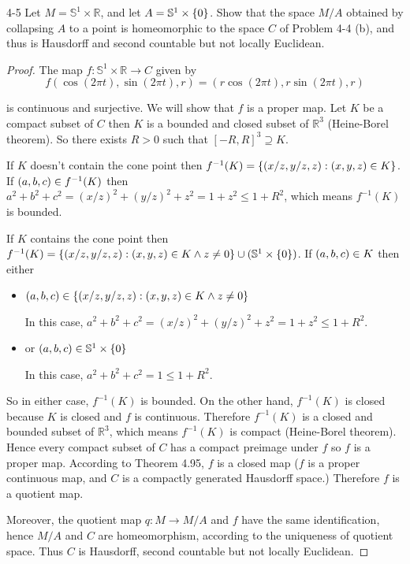 \begin{problem}{4-5}
Let $M = \mathbb{S}^{1}\times\mathbb{R}$, and let $A = \mathbb{S}^{1} \times \left\{{0}\right\}$. Show that the space $M/A$ obtained by collapsing $A$ to a point is homeomorphic to the space $C$ of Problem 4-4 (b), and thus is Hausdorff and second countable but not locally Euclidean.
\end{problem}

\begin{proof}
	The map $f: \mathbb{S}^{1}\times\mathbb{R} \to C$ given by
	\begin{equation*}
		f(\cos(2\pi t), \sin(2\pi t), r) = (r\cos(2\pi t), r\sin(2\pi t), r)
	\end{equation*}

	is continuous and surjective. We will show that $f$ is a proper map. Let $K$ be a compact subset of $C$ then $K$ is a bounded and closed subset of $\mathbb{R}^{3}$ (Heine-Borel theorem). So there exists $R > 0$ such that ${[-R, R]}^{3} \supseteq K$.

	If $K$ doesn't contain the cone point then $f^{-1}(K) = \left\{{\left({x/z, y/z, z}\right) : \left({x, y, z}\right) \in K}\right\}$. If $\left({a,b,c}\right) \in f^{-1}(K)$ then $a^{2} + b^{2} + c^{2} = {(x/z)}^{2} + {(y/z)}^{2} + z^{2} = 1 + z^{2} \leq 1 + R^{2}$, which means $f^{-1}(K)$ is bounded.

	If $K$ contains the cone point then $f^{-1}(K) = \left\{{\left({x/z, y/z,z}\right) : \left({x, y, z}\right)\in K \land z\ne 0}\right\} \cup (\mathbb{S}^{1} \times \left\{{0}\right\})$. If $\left({a, b, c}\right) \in K$ then either
	\begin{itemize}
		\item $\left({a, b, c}\right)\in \left\{{\left({x/z, y/z, z}\right) : \left({x,y,z}\right)\in K \land z\ne 0}\right\}$

		      In this case, $a^{2} + b^{2} + c^{2} = {(x/z)}^{2} + {(y/z)}^{2} + z^{2} = 1 + z^{2} \leq 1 + R^{2}$.
		\item or $\left({a, b, c}\right)\in \mathbb{S}^{1}\times\left\{{0}\right\}$

		      In this case, $a^{2} + b^{2} + c^{2} = 1 \leq 1 + R^{2}$.
	\end{itemize}

	So in either case, $f^{-1}(K)$ is bounded. On the other hand, $f^{-1}(K)$ is closed because $K$ is closed and $f$ is continuous. Therefore $f^{-1}(K)$ is a closed and bounded subset of $\mathbb{R}^{3}$, which means $f^{-1}(K)$ is compact (Heine-Borel theorem). Hence every compact subset of $C$ has a compact preimage under $f$ so $f$ is a proper map. According to Theorem 4.95, $f$ is a closed map ($f$ is a proper continuous map, and $C$ is a compactly generated Hausdorff space.) Therefore $f$ is a quotient map.

	Moreover, the quotient map $q: M\to M/A$ and $f$ have the same identification, hence $M/A$ and $C$ are homeomorphism, according to the uniqueness of quotient space. Thus $C$ is Hausdorff, second countable but not locally Euclidean.
\end{proof}

